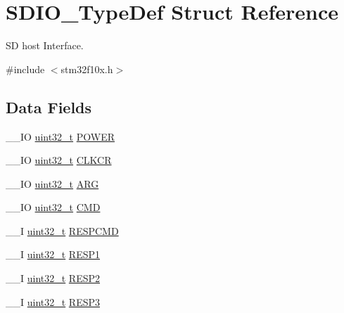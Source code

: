 \hypertarget{struct_s_d_i_o___type_def}{\section{S\-D\-I\-O\-\_\-\-Type\-Def Struct Reference}
\label{struct_s_d_i_o___type_def}
}


S\-D host Interface.  




{\ttfamily \#include $<$stm32f10x.\-h$>$}

\subsection*{Data Fields}
\begin{DoxyCompactItemize}
\item 
\-\_\-\-\_\-\-I\-O \hyperlink{stdint_8h_a435d1572bf3f880d55459d9805097f62}{uint32\-\_\-t} \hyperlink{struct_s_d_i_o___type_def_a7c156bc55f6d970a846a459d57a9e940}{P\-O\-W\-E\-R}
\item 
\-\_\-\-\_\-\-I\-O \hyperlink{stdint_8h_a435d1572bf3f880d55459d9805097f62}{uint32\-\_\-t} \hyperlink{struct_s_d_i_o___type_def_aeb1e30ce2038628e45264f75e5e926bb}{C\-L\-K\-C\-R}
\item 
\-\_\-\-\_\-\-I\-O \hyperlink{stdint_8h_a435d1572bf3f880d55459d9805097f62}{uint32\-\_\-t} \hyperlink{struct_s_d_i_o___type_def_a3e24392875e98cd09043e54a0990ab7a}{A\-R\-G}
\item 
\-\_\-\-\_\-\-I\-O \hyperlink{stdint_8h_a435d1572bf3f880d55459d9805097f62}{uint32\-\_\-t} \hyperlink{struct_s_d_i_o___type_def_abbbdc3174e12dab21123d746d65f345d}{C\-M\-D}
\item 
\-\_\-\-\_\-\-I \hyperlink{stdint_8h_a435d1572bf3f880d55459d9805097f62}{uint32\-\_\-t} \hyperlink{struct_s_d_i_o___type_def_a9d881ed6c2fdecf77e872bcc6b404774}{R\-E\-S\-P\-C\-M\-D}
\item 
\-\_\-\-\_\-\-I \hyperlink{stdint_8h_a435d1572bf3f880d55459d9805097f62}{uint32\-\_\-t} \hyperlink{struct_s_d_i_o___type_def_a2b6f1ca5a5a50f8ef5417fe7be22553c}{R\-E\-S\-P1}
\item 
\-\_\-\-\_\-\-I \hyperlink{stdint_8h_a435d1572bf3f880d55459d9805097f62}{uint32\-\_\-t} \hyperlink{struct_s_d_i_o___type_def_a9228c8a38c07c508373644220dd322f0}{R\-E\-S\-P2}
\item 
\-\_\-\-\_\-\-I \hyperlink{stdint_8h_a435d1572bf3f880d55459d9805097f62}{uint32\-\_\-t} \hyperlink{struct_s_d_i_o___type_def_a70f3e911570bd326bff852664fd8a7d5}{R\-E\-S\-P3}

\end{DoxyCompactItemize}
